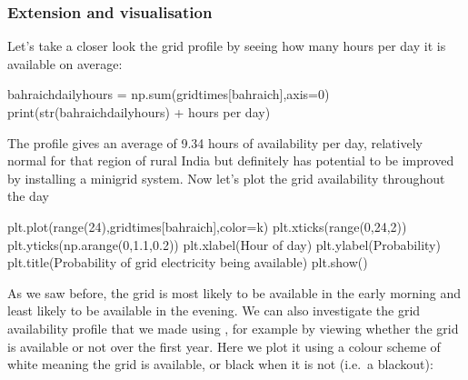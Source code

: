 \documentclass[letterpaper,10pt,english]{sphinxmanual}
\begin{document}
\subsubsection{Extension and visualisation}
\label{\detokenize{electricity_generation:id2}}
\sphinxAtStartPar
Let’s take a closer look the  grid profile by seeing how
many hours per day it is available on average:

\begin{sphinxVerbatim}[commandchars=\\\{\}]
bahraich\PYGZus{}daily\PYGZus{}hours = np.sum(grid\PYGZus{}times[\PYGZsq{}bahraich\PYGZsq{}],axis=0)
print(str(bahraich\PYGZus{}daily\PYGZus{}hours) + \PYGZsq{} hours per day\PYGZsq{})
\end{sphinxVerbatim}

\begin{sphinxVerbatim}[commandchars=\\\{\}]
   
\end{sphinxVerbatim}

\sphinxAtStartPar
The  profile gives an average of 9.34 hours of availability
per day, relatively normal for that region of rural India but definitely
has potential to be improved by installing a minigrid system. Now let’s
plot the grid availability throughout the day

\begin{sphinxVerbatim}[commandchars=\\\{\}]
plt.plot(range(24),grid\PYGZus{}times[\PYGZsq{}bahraich\PYGZsq{}],color=\PYGZsq{}k\PYGZsq{})
plt.xticks(range(0,24,2))
plt.yticks(np.arange(0,1.1,0.2))
plt.xlabel(\PYGZsq{}Hour of day\PYGZsq{})
plt.ylabel(\PYGZsq{}Probability\PYGZsq{})
plt.title(\PYGZsq{}Probability of grid electricity being available\PYGZsq{})
plt.show()
\end{sphinxVerbatim}

\noindent{}

\sphinxAtStartPar
As we saw before, the grid is most likely to be available in the early
morning and least likely to be available in the evening. We can also
investigate the  grid availability profile that we made
using , for example by viewing
whether the grid is available or not over the first year. Here we plot
it using a colour scheme of white meaning the grid is available, or
black when it is not (i.e. a blackout):
\end{document}
